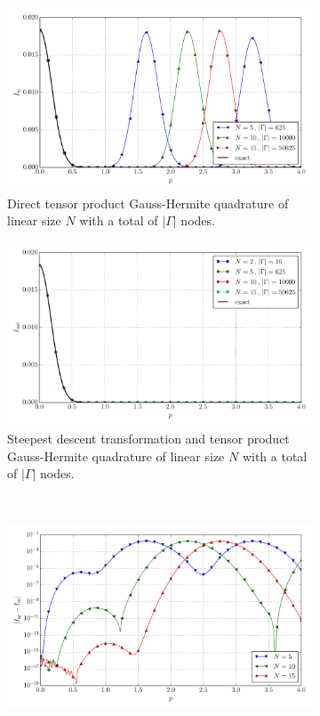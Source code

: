 \documentclass[a4paper,10pt]{article}
\begin{document}
\begin{figure}[ht!]
  \begin{subfigure}[t]{0.5\linewidth}
    \includegraphics[width=\linewidth]{./plots/tp_4d_conv_p_(0,0,0,0)_(0,0,0,0)_val_qr.pdf}
    \caption{Direct tensor product Gauss-Hermite quadrature of linear size $N$ with a total of $|\Gamma|$ nodes.}
    \label{fig:tp_4d_conv_p_0000_0000_val_qr}
  \end{subfigure}
  \begin{subfigure}[t]{0.5\linewidth}
    \includegraphics[width=\linewidth]{./plots/tp_4d_conv_p_(0,0,0,0)_(0,0,0,0)_val_nsd.pdf}
    \caption{Steepest descent transformation and tensor product Gauss-Hermite quadrature of linear size $N$ with a total of $|\Gamma|$ nodes.}
    \label{fig:tp_4d_conv_p_0000_0000_val_nsd}
  \end{subfigure} \\
  \begin{subfigure}[t]{0.5\linewidth}
    \includegraphics[width=\linewidth]{./plots/tp_4d_conv_p_(0,0,0,0)_(0,0,0,0)_err_qr.pdf}

\end{subfigure}
\end{figure}
\end{document}
